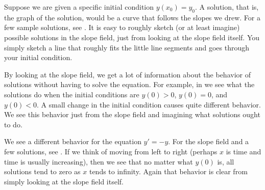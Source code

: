 Suppose we are given a specific initial condition $y(x_0) = y_0$.
A solution, that is, the graph of the solution, would be a curve
that follows the slopes we drew.
For a few sample
solutions, see .  It is easy to roughly sketch
(or at least imagine)
possible solutions in the slope field, just from looking at the slope field
itself.  You simply sketch a line that roughly fits the little line segments
and goes through your initial condition.

\begin{myfig}
\parbox[t]{3.0in}{
 \capstart
 \caption{Slope field of $y' = xy$.\label{1.3:fig1}}
}
\quad
\parbox[t]{3.0in}{
 \capstart
 \caption{Slope field of $y' = xy$ with a graph of solutions satisfying
 $y(0) = 0.2$, $y(0) = 0$, and $y(0) = -0.2$.\label{1.3:fig2}}
}
\end{myfig}

By looking at the slope field, we get a lot of information
about the behavior of solutions without having to solve
the equation.  For
example, in  we see what the solutions do when the initial conditions
are $y(0) > 0$, $y(0) = 0$, and $y(0) < 0$.
A small change in the
initial condition causes quite different behavior.
We see this behavior just
from the slope field and imagining what solutions ought to do.

We see a different behavior for the equation
$y' = -y$.  For the slope field and a few solutions,
see .
If we think of moving from left to right (perhaps $x$ is time
and time is usually increasing), then
we see that no matter what $y(0)$ is, all solutions tend to zero as $x$
tends to infinity.
Again that behavior is clear from simply
looking at the slope field itself.

\begin{myfig}
\capstart
{}
\caption{Slope field of $y' = -y$ with a graph of a few solutions.\label{1.3:fig3}}
\end{myfig}

